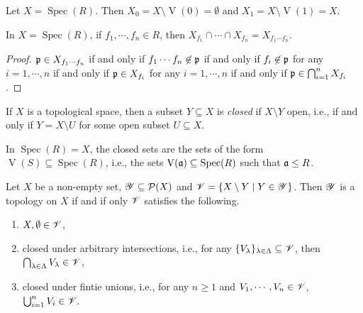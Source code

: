 \begin{fact}
    Let $X = \operatorname{Spec}(R)$. Then $X_0 = X \setminus \operatorname{V}(0) = \emptyset$ and $X_1 = X \setminus \operatorname{V}(1) = X$.
\end{fact}

\begin{proposition}
    In $X = \operatorname{Spec}(R)$, if $f_1,\cdots,f_n \in R$, then $X_{f_1} \cap \cdots \cap X_{f_n} = X_{f_1 \cdots f_n}$.
\end{proposition}

\begin{proof}
    $\mathfrak{p} \in X_{f_1 \cdots f_n}$ if and only if $f_1 \cdots f_n \not \in \mathfrak{p}$ if and only if $f_i \not \in \mathfrak{p}$ for any $i = 1,\cdots,n$ if and only if $\mathfrak{p} \in X_{f_i}$ for any $i = 1,\cdots,n$ if and only if $\mathfrak{p} \in \bigcap_{i=1}^n X_{f_i}$.
\end{proof}

\begin{definition}
    If $X$ is a topological space, then a subset $Y \subseteq X$ is \emph{closed} if $X \setminus Y$ open, i.e., if and only if $Y = X \setminus U$ for some open subset $U \subseteq X$.
\end{definition}

\begin{example}
    In $\operatorname{Spec}(R) = X$, the closed sets are the sets of the form $\operatorname{V}(S) \subseteq \operatorname{Spec}(R)$, i.e., the sets $\operatorname{V}(\mathfrak{a}) \subseteq \operatorname{Spec}(R)$ such that $\mathfrak{a} \leq R$.
\end{example}

\begin{proposition}
    Let $X$ be a non-empty set, $\mathscr{Y} \subseteq \mathcal{P}(X)$ and $\mathscr{V} = \{X \setminus Y \mid Y \in \mathscr{Y}\}$. Then $\mathscr{Y}$ is a topology on $X$ if and if only $\mathscr{V}$ satisfies the following.
    \begin{enumerate}
        \item $X,\emptyset \in \mathscr{V}$,
        \item closed under arbitrary intersections, i.e., for any $\{V_\lambda\}_{\lambda \in \Lambda} \subseteq \mathscr{V}$, then $\bigcap_{\lambda \in \Lambda} V_\lambda \in \mathscr{V}$,
        \item closed under fintie unions, i.e., for any $n \geq 1$ and $V_1,\cdots,V_n \in \mathscr{V}$, $\bigcup_{i=1}^n V_i \in \mathscr{V}$.
    \end{enumerate}
\end{proposition}

